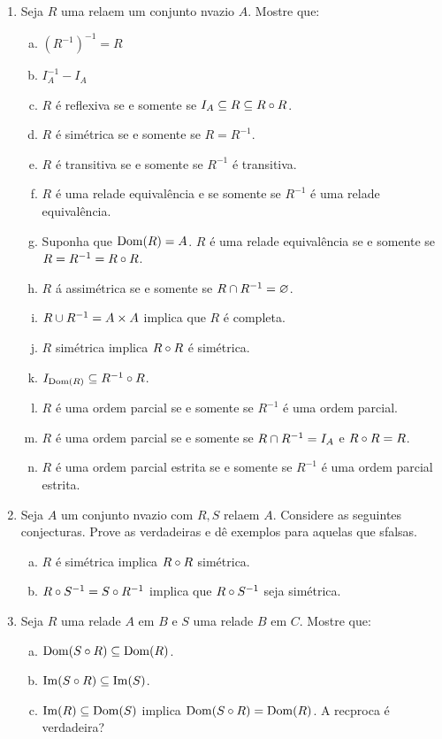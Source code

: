 \begin{enumerate}[{\bf 1.}]
\item Seja $R$ uma rela\cao em um conjunto n\ao vazio $A$. Mostre que:
\begin{enumerate}[a)]
\item $(R^{-1})^{-1}=R$
\item $I_A^{-1}-I_A$
\item $R$ \'e reflexiva se e somente se $I_A\subseteq R\subseteq R\circ R$.
\item $R$ \'e sim\'etrica se e somente se $R=R^{-1}$.
\item $R$ \'e transitiva se e somente se $R^{-1}$ \'e transitiva.
\item $R$ \'e uma rela\cao de equival\^encia e se somente se $R^{-1}$ \'e uma rela\cao de equival\^encia.
\item Suponha que $\operatorname{Dom}(R)=A$. $R$ \'e uma rela\cao de equival\^encia se e somente se $R=R^{-1}=R\circ R$.
\item $R$ \'a assim\'etrica se e somente se $R\cap R^{-1}=\varnothing$.
\item $R\cup R^{-1}=A\times A$ implica que $R$ \'e completa.
\item $R$ sim\'etrica implica $R\circ R$ \'e sim\'etrica.
\item $I_{\operatorname{Dom}(R)}\subseteq R^{-1}\circ R$.
\item $R$ \'e uma ordem parcial se e somente se $R^{-1}$ \'e uma ordem parcial.
\item $R$ \'e uma ordem parcial se e somente se $R\cap R^{-1}=I_A$ e $R\circ R=R$.
\item $R$ \'e uma ordem parcial estrita se e somente se $R^{-1}$ \'e uma ordem parcial estrita.
\end{enumerate}

\item Seja $A$ um conjunto n\ao vazio com $R,S$ rela\coes em $A$. Considere as seguintes conjecturas. Prove as verdadeiras e d\^e exemplos para aquelas que s\ao falsas.
\begin{enumerate}[a)]
\item $R$ \'e sim\'etrica implica $R\circ R$ sim\'etrica.
\item $R\circ S^{-1}=S\circ R^{-1}$ implica que $R\circ S^{-1}$ seja sim\'etrica.
\end{enumerate}

\item Seja $R$ uma rela\cao de $A$ em $B$ e $S$ uma rela\cao  de $B$ em $C$. Mostre que:
\begin{enumerate}[a)]
\item $\operatorname{Dom}(S\circ R)\subseteq \operatorname{Dom}(R)$.
\item $\operatorname{Im}(S\circ R)\subseteq \operatorname{Im}(S)$.
\item $\operatorname{Im}(R)\subseteq \operatorname{Dom}(S)$ implica $\operatorname{Dom}(S\circ R)=\operatorname{Dom}(R)$. A rec\ih proca \'e verdadeira? 
\end{enumerate}


\end{enumerate}
